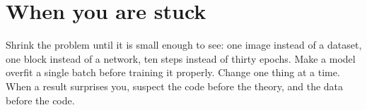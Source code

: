 \section{When you are stuck}

Shrink the problem until it is small enough to see: one image instead of a dataset, one block instead of a
network, ten steps instead of thirty epochs. Make a model overfit a single batch before training it properly.
Change one thing at a time. When a result surprises you, suspect the code before the theory, and the data before
the code.

